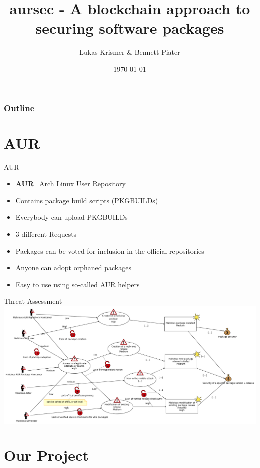 \documentclass{beamer}
\title{aursec - A blockchain approach to securing software packages}
\author{Lukas Krismer \& Bennett Piater}
\institute{Universität Innsbruck - QE - Christian Sillaber}
\date{\today}
\begin{document}
\maketitle


\begin{frame}
	\frametitle{Outline}
	\tableofcontents
\end{frame}

\section{AUR}

\begin{frame}{AUR}
\begin{itemize}
	\item \textbf{AUR}=\alert{A}rch Linux \alert{U}ser \alert{R}epository
	\item Contains package build scripts (PKGBUILDs)
	\item Everybody can upload PKGBUILDs
	\item 3 different Requests %
	\item Packages can be voted for inclusion in the official repositories
	\item Anyone can adopt orphaned packages
	\item Easy to use using so-called AUR helpers
\end{itemize}
\end{frame}

\begin{frame}{Threat Assessment}
\includegraphics[width=\textwidth]{threat.png}
\end{frame}

\section{Our Project}
\end{document}

